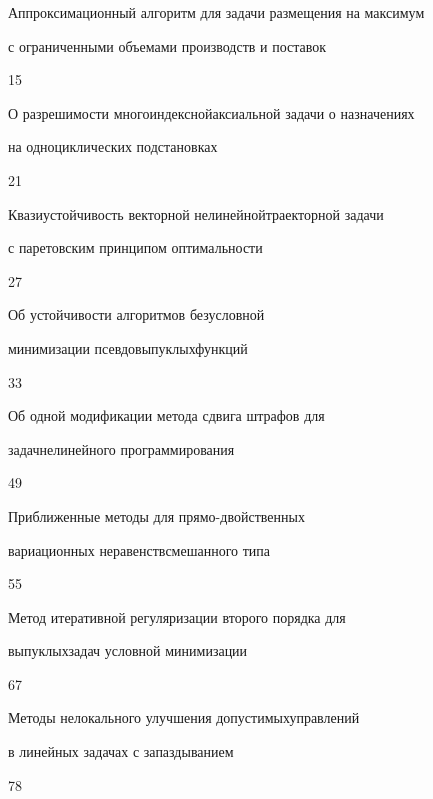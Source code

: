 

{Аппроксимационный алгоритм для задачи размещения на максимум\newline


с ограниченными объемами производств и поставок}{15}




{О разрешимости многоиндексной\newline аксиальной задачи о назначениях


на одноциклических подстановках}{21}




{Квазиустойчивость векторной нелинейной\newline траекторной задачи


с паретовским принципом оптимальности}{27}




{Об устойчивости алгоритмов безусловной


минимизации псевдовыпуклых\newline функций}{33}




{Об одной модификации метода сдвига штрафов для 


задач\newline нелинейного программирования}{49}




{Приближенные методы для прямо-двойственных 


вариационных неравенств\newline смешанного типа}{55}




{Метод итеративной регуляризации второго порядка для


выпуклых\newline задач условной минимизации}{67}




{Методы нелокального улучшения допустимых\newline управлений


в линейных задачах с запаздыванием}{78}








\bigskip





